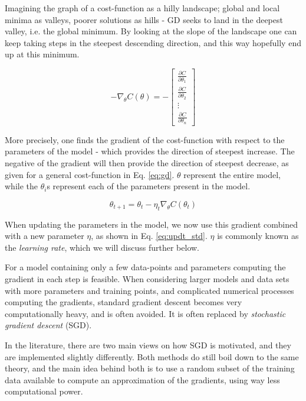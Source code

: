 Imagining the graph of a cost-function as a hilly landscape; global and local minima as valleys, poorer solutions as hills - GD seeks to land in the deepest valley, i.e. the global minimum. 
By looking at the slope of the landscape one can keep taking steps in the steepest descending direction, and this way hopefully end up at this minimum.

\begin{equation}\label{eq:gd}
    -\nabla_\theta C(\theta) = -\begin{bmatrix}
\frac{\partial C}{\partial \theta_1} \\
\frac{\partial C}{\partial \theta_2} \\
\vdots \\
\frac{\partial C}{\partial \theta_n}
\end{bmatrix}
\end{equation}

More precisely, one finds the gradient of the cost-function with respect to the parameters of the model - which provides the direction of steepest increase. The negative of the gradient will then provide the direction of steepest decrease, as given for a general cost-function in Eq. \ref{eq:gd}. $\theta$ represent the entire model, while the $\theta_i$s represent each of the parameters present in the model.

\begin{equation}\label{eq:updt_std}
    \theta_{t+1} = \theta_t - \eta_t \nabla_{\theta} C(\theta_t)
\end{equation}

When updating the parameters in the model, we now use this gradient combined with a new parameter $\eta$, as shown in Eq. \ref{eq:updt_std}.
$\eta$ is commonly known as the \textit{learning rate}, which we will discuss further below.

For a model containing only a few data-points and parameters computing the gradient in each step is feasible.
When considering larger models and data sets with more parameters and training points, and complicated numerical processes computing the gradients, standard gradient descent becomes very computationally heavy, and is often avoided.
It is often replaced by \textit{stochastic gradient descent} (SGD).

In the literature, there are two main views on how SGD is motivated, and they are implemented slightly differently.
Both methods do still boil down to the same theory, and the main idea behind both is to use a random subset of the training data available to compute an approximation of the gradients, using way less computational power.

